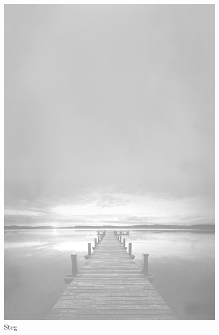 \documentclass[ngerman,a4paper,11pt]{scrreprt}
\begin{document}
\begin{figure}[H]
\centering
\includegraphics[width=\textwidth,height=.8\textheight]{Bilder/Bilder/750_0010_15649__Steg.png}
\caption{Steg}
\end{figure}
\end{document}
